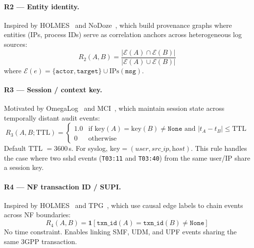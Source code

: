 \paragraph{R2 — Entity identity.}
Inspired by HOLMES~\cite{milajerdi2019holmes} and NoDoze~\cite{hassan2019nodoze},
which build provenance graphs where entities (IPs, process IDs) serve as
correlation anchors across heterogeneous log sources:
\begin{equation}
R_2(A,B) = \frac{|\mathcal{E}(A) \cap \mathcal{E}(B)|}{|\mathcal{E}(A) \cup \mathcal{E}(B)|}
\end{equation}
where $\mathcal{E}(e) = \{\texttt{actor}, \texttt{target}\} \cup \text{IPs}(\texttt{msg})$.

\paragraph{R3 — Session / context key.}
Motivated by OmegaLog~\cite{hassan2020omegalog} and MCI~\cite{kwon2018mci},
which maintain session state across temporally distant audit events:
\begin{equation}
R_3(A,B;\text{TTL}) =
\begin{cases}
1.0 & \text{if } \text{key}(A) = \text{key}(B) \neq \texttt{None}
      \text{ and } |t_A - t_B| \leq \text{TTL} \\
0   & \text{otherwise}
\end{cases}
\end{equation}
Default TTL $= 3600$\,s. For syslog, key$= (\textit{user}, \textit{src\_ip}, \textit{host})$.
This rule handles the case where two sshd events (\texttt{T03:11} and
\texttt{T03:40}) from the same user/IP share a session key.

\paragraph{R4 — NF transaction ID / SUPI.}
Inspired by HOLMES~\cite{milajerdi2019holmes} and TPG~\cite{hassan2020tpg},
which use causal edge labels to chain events across NF boundaries:
\begin{equation}
R_4(A,B) = \mathbf{1}[\texttt{txn\_id}(A) = \texttt{txn\_id}(B) \neq \texttt{None}]
\end{equation}
No time constraint. Enables linking SMF, UDM, and UPF events sharing the
same 3GPP transaction.

